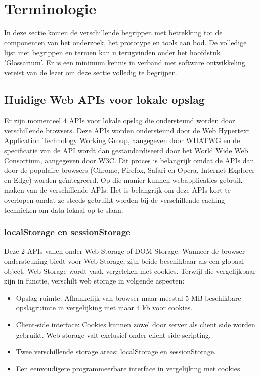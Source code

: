 \section{Terminologie}
\label{sec:terminologie}
In deze sectie komen de verschillende begrippen met betrekking tot de componenten van het onderzoek, het prototype en tools aan bod. De volledige lijst met begrippen en termen kan u terugvinden onder het hoofdstuk 'Glossarium'. Er is een minimum kennis in verband met software ontwikkeling vereist van de lezer om deze sectie volledig te begrijpen.
\subsection{Huidige Web APIs voor lokale opslag}
Er zijn momenteel 4 APIs voor lokale opslag die ondersteund worden door verschillende browsers. Deze APIs worden ondersteund door de Web Hypertext Application Technology Working Group, aangegeven door WHATWG en de specificatie van de API wordt dan gestandardiseerd door het World Wide Web Consortium, aangegeven door W3C. Dit proces is belangrijk omdat de APIs dan door de populaire browsers (Chrome, Firefox, Safari en Opera, Internet Explorer en Edge) worden ge\"integreerd. Op die manier kunnen webapplicaties gebruik maken van de verschillende APIs. Het is belangrijk om deze APIs kort te overlopen omdat ze steeds gebruikt worden bij de verschillende caching technieken om data lokaal op te slaan.
\subsubsection{localStorage en sessionStorage}
Deze 2 APIs vallen onder Web Storage of DOM Storage. Wanneer de browser ondersteuning biedt voor Web Storage, zijn beide beschikbaar als een globaal object. Web Storage wordt vaak vergeleken met cookies. Terwijl die vergelijkbaar zijn in functie, verschilt web storage in volgende aspecten: 
\begin{itemize}  
\item Opslag ruimte: Afhankelijk van browser maar meestal 5 MB beschikbare opslagruimte in vergelijking met maar 4 kb voor cookies.
\item Client-side interface: Cookies kunnen zowel door server als client side worden gebruikt. Web storage valt exclusief onder client-side scripting.
\item Twee verschillende storage areas: localStorage en sessionStorage.
\item Een eenvoudigere programmeerbare interface in vergelijking met cookies.
\end{itemize}
